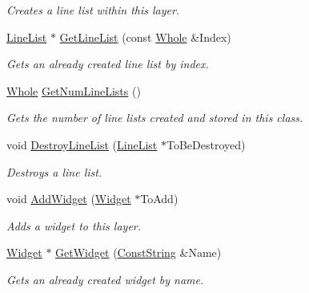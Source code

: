 \begin{DoxyCompactItemize}
\begin{DoxyCompactList}\small\item\em Creates a line list within this layer. \item\end{DoxyCompactList}\item 
\hyperlink{classphys_1_1UI_1_1LineList}{LineList} $\ast$ \hyperlink{classphys_1_1UI_1_1Layer_aa0ec04b512d7c2ad2808a2dc0e435905}{GetLineList} (const \hyperlink{namespacephys_a460f6bc24c8dd347b05e0366ae34f34a}{Whole} \&Index)
\begin{DoxyCompactList}\small\item\em Gets an already created line list by index. \item\end{DoxyCompactList}\item 
\hyperlink{namespacephys_a460f6bc24c8dd347b05e0366ae34f34a}{Whole} \hyperlink{classphys_1_1UI_1_1Layer_aa25225bb0011d26038959420153d9714}{GetNumLineLists} ()
\begin{DoxyCompactList}\small\item\em Gets the number of line lists created and stored in this class. \item\end{DoxyCompactList}\item 
void \hyperlink{classphys_1_1UI_1_1Layer_aa0854e22fefd9378b0cdf7a217a3aeeb}{DestroyLineList} (\hyperlink{classphys_1_1UI_1_1LineList}{LineList} $\ast$ToBeDestroyed)
\begin{DoxyCompactList}\small\item\em Destroys a line list. \item\end{DoxyCompactList}\item 
void \hyperlink{classphys_1_1UI_1_1Layer_ae2425e1ca2a7dd8f5912dad497f3beca}{AddWidget} (\hyperlink{classphys_1_1UI_1_1Widget}{Widget} $\ast$ToAdd)
\begin{DoxyCompactList}\small\item\em Adds a widget to this layer. \item\end{DoxyCompactList}\item 
\hyperlink{classphys_1_1UI_1_1Widget}{Widget} $\ast$ \hyperlink{classphys_1_1UI_1_1Layer_a4340e70c9ab4083236d4a4c8d804c62a}{GetWidget} (\hyperlink{namespacephys_a5ce5049f8b4bf88d6413c47b504ebb31}{ConstString} \&Name)
\begin{DoxyCompactList}\small\item\em Gets an already created widget by name. \item\end{DoxyCompactList}\item 

\end{DoxyCompactItemize}

